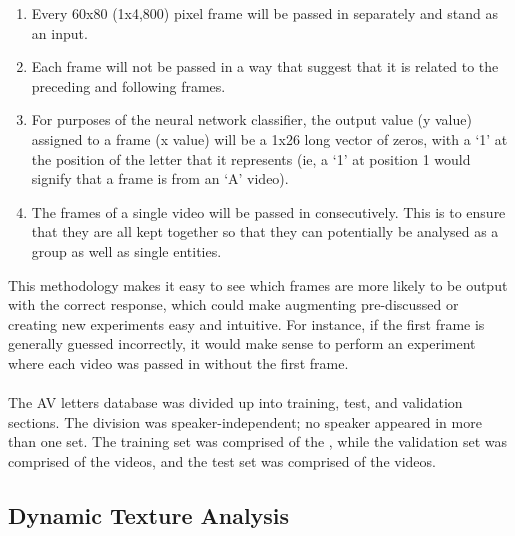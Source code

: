 \documentclass[12pt,twoside]{report}
\begin{document}
\begin{enumerate}
\item Every 60x80 (1x4,800) pixel frame will be passed in separately and stand as an input.
\item Each frame will not be passed in a way that suggest that it is related to the preceding and following frames. 
\item For purposes of the neural network classifier, the output value (y value) assigned to a frame (x value) will be a 1x26 long vector of zeros, with a ‘1’ at the position of the letter that it represents (ie, a ‘1’ at position 1 would signify that a frame is from an ‘A’ video). 
\item The frames of a single video will be passed in consecutively. This is to ensure that they are all kept together so that they can potentially be analysed as a group as well as single entities. 
\end{enumerate}

This methodology makes it easy to see which frames are more likely to be output with the correct response, which could make augmenting pre-discussed or creating new experiments easy and intuitive. For instance, if the first frame is generally guessed incorrectly, it would make sense to perform an experiment where each video was passed in without the first frame. 
\\ \\
The AV letters database was divided up into training, test, and validation sections. The division was speaker-independent; no speaker appeared in more than one set. The training set was comprised of the , while the validation set was comprised of the videos, and the test set was comprised of the videos. 

		\subsection{Dynamic Texture Analysis}
		
\end{document}
